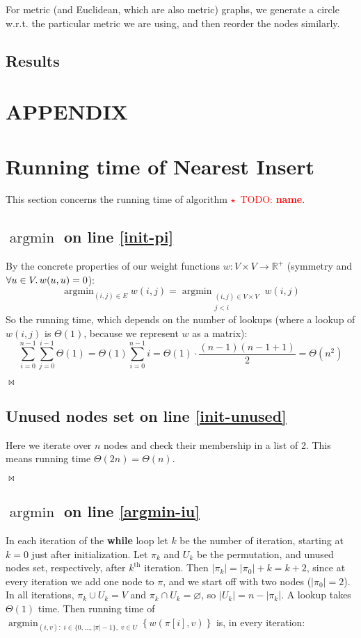 \documentclass{article}
\newcommand{\todo}[1]{\textcolor{red}{$\star$~TODO: \textbf{#1}}}
\DeclareMathOperator*{\argmin}{argmin}
\newcommand{\qed}{\begin{flushright}$\bowtie$\end{flushright}}
\newcommand{\bb}[1]{\textbf{#1}}
\renewcommand{\thesection}{\Alph{section}}
\begin{document}
For metric (and Euclidean, which are also metric) graphs, we generate a circle w.r.t.
the particular metric we are using, and then reorder the nodes similarly.

\subsection{Results}


\appendix
\section*{APPENDIX}
\renewcommand{\thesection}{\roman{section}}
\section{Running time of Nearest Insert}
\label{appendix:runtime-ni}

This section concerns the running time of algorithm \todo{name}.

\subsection{$\argmin$ on line \ref*{init-pi}}

By the concrete properties of our weight functions $w:V\times V\to\mathbb{R}^{+}$
(symmetry and $\forall u\in V\ldotp w(u,u)=0$):
\[ \argmin_{(i,j)\in E} w(i,j) = \argmin_{\substack{(i,j)\in V\times V\\j<i}} w(i,j) \]
So the running time, which depends on the number of lookups (where a lookup of $w(i,j)$
is $\Theta(1)$, because we represent $w$ as a matrix):
\[ \sum_{i=0}^{n-1} \sum_{j=0}^{i-1} \Theta(1) = \Theta(1) \sum_{i=0}^{n-1} i
  = \Theta(1) \cdot \frac{(n-1)(n-1+1)}{2} = \Theta(n^2) \]
\qed

\subsection{Unused nodes set on line \ref*{init-unused}}

Here we iterate over $n$ nodes and check their membership in a list of 2. This means
running time $\Theta(2n) = \Theta(n)$. \qed

\subsection{$\argmin$ on line \ref*{argmin-iu}}

In each iteration of the \bb{while} loop let $k$ be the number of iteration,
starting at $k=0$ just after initialization. Let $\pi_k$ and $U_k$ be the permutation,
and unused nodes set, respectively, after $k^{\mathrm{th}}$ iteration.
Then $|\pi_k| = |\pi_0|+k = k+2$, since at every iteration we
add one node to $\pi$, and we start off with two nodes ($|\pi_0|=2$). In all iterations,
$\pi_k\cup U_k=V$ and $\pi_k\cap U_k=\varnothing$, so $|U_k|=n-|\pi_k|$. A lookup takes
$\Theta(1)$ time. Then running time of $\argmin_{(i,v):\;i\in\{0,...,|\pi|-1\},\;v\in U}
\left\{w\left(\pi[i], v\right)\right\}$ is, in every iteration:
\end{document}
